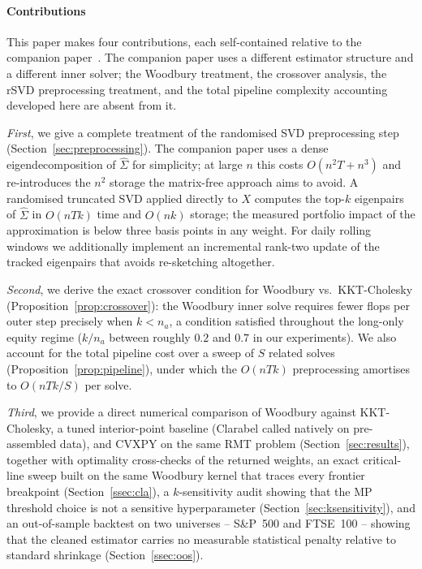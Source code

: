 \paragraph{Contributions}
This paper makes four contributions, each self-contained relative to the
companion paper~\cite{fast_minimum_variance}.
The companion paper uses a different estimator structure and a different inner
solver; the Woodbury treatment, the crossover analysis, the rSVD preprocessing
treatment, and the total pipeline complexity accounting developed here are absent
from it.

\emph{First}, we give a complete treatment of the randomised SVD preprocessing
step (Section~\ref{sec:preprocessing}). The companion paper uses a dense
eigendecomposition of $\hat\Sigma$ for simplicity; at large $n$ this
costs $O(n^2 T + n^3)$ and re-introduces the $n^2$ storage the matrix-free
approach aims to avoid. A randomised truncated SVD applied directly to $X$
computes the top-$k$ eigenpairs of $\hat\Sigma$ in $O(nTk)$ time and $O(nk)$
storage; the measured portfolio impact of the approximation is below three
basis points in any weight. For daily rolling windows we additionally
implement an incremental rank-two update of the tracked eigenpairs that
avoids re-sketching altogether.

\emph{Second}, we derive the exact crossover condition for Woodbury vs.\
KKT-Cholesky (Proposition~\ref{prop:crossover}): the Woodbury inner solve
requires fewer flops per outer step precisely when $k < n_a$, a condition
satisfied throughout the long-only equity regime
($k/n_a$ between roughly $0.2$ and $0.7$ in our experiments). We also account
for the total pipeline cost over a sweep of $S$ related solves
(Proposition~\ref{prop:pipeline}), under which the $O(nTk)$ preprocessing
amortises to $O(nTk/S)$ per solve.

\emph{Third}, we provide a direct numerical comparison of Woodbury against
KKT-Cholesky, a tuned interior-point baseline (Clarabel called natively on
pre-assembled data), and CVXPY on the same RMT problem
(Section~\ref{sec:results}), together with optimality cross-checks of the
returned weights, an exact critical-line sweep built on the same Woodbury
kernel that traces every frontier breakpoint (Section~\ref{ssec:cla}), a
$k$-sensitivity audit showing that the MP threshold choice
is not a sensitive hyperparameter (Section~\ref{sec:ksensitivity}), and an
out-of-sample backtest on two universes -- S\&P~500 and FTSE~100 -- showing
that the cleaned estimator carries no measurable statistical penalty relative
to standard shrinkage (Section~\ref{ssec:oos}).

